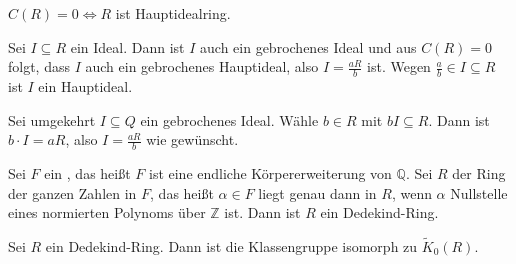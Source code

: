 \begin{lemma}
	$C(R)=0 \iff R$ ist Hauptidealring.
\end{lemma}
\begin{beweis}
	Sei $I \subseteq R$ ein Ideal.
	Dann ist $I$ auch ein gebrochenes Ideal und aus $C(R)=0$ folgt, dass $I$ auch ein gebrochenes Hauptideal, also $I = \frac{aR}{b}$ ist.
	Wegen $\frac{a}{b} \in I \subseteq R$ ist $I$ ein Hauptideal.
	
	Sei umgekehrt $I \subseteq Q$ ein gebrochenes Ideal.
	Wähle $b \in R$ mit $b I \subseteq R$.
	Dann ist $b \cdot I=a R$, also $I= \frac{a R}{b}$ wie gewünscht. 
\end{beweis}

\begin{satz}[label=satz:2:1]
	Sei $F$ ein , das heißt $F$ ist eine endliche Körpererweiterung von $\mathbb{Q}$.
	Sei $R$ der Ring der ganzen Zahlen in $F$, das heißt $\alpha \in F$ liegt genau dann in $R$, wenn $\alpha$ Nullstelle eines normierten Polynoms über $\mathbb{Z}$ ist.
	Dann ist $R$ ein Dedekind-Ring.
\end{satz}


\begin{satz}[label=satz:klassengruppe_K_0]
	Sei $R$ ein Dedekind-Ring.
	Dann ist die Klassengruppe isomorph zu $\tilde{K}_0(R)$.
\end{satz}

